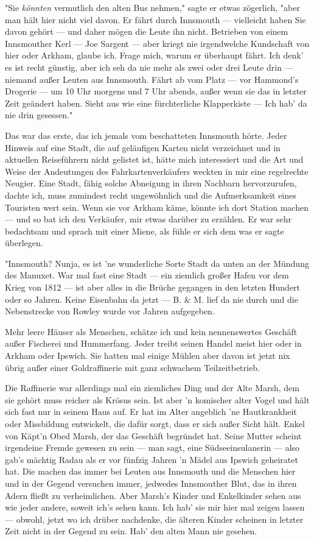 "Sie \textit{könnten} vermutlich den alten Bus nehmen," sagte er etwas zögerlich, "aber man hält hier nicht viel davon. Er fährt durch Innsmouth --- vielleicht haben Sie davon gehört --- und daher mögen die Leute ihn nicht. Betrieben von einem Innsmouther Kerl --- Joe Sargent --- aber kriegt nie irgendwelche Kundschaft von hier oder Arkham, glaube ich. Frage mich, warum er überhaupt fährt. Ich denk' es ist recht günstig, aber ich seh da nie mehr als zwei oder drei Leute drin --- niemand außer Leuten aus Innsmouth. Fährt ab vom Platz --- vor Hammond's Drogerie --- um 10 Uhr morgens und 7 Uhr abends, außer wenn sie das in letzter Zeit geändert haben. Sieht aus wie eine fürchterliche Klapperkiste --- Ich hab' da nie drin gesessen."

Das war das erste, das ich jemals vom beschatteten Innsmouth hörte. Jeder Hinweis auf eine Stadt, die auf geläufigen Karten nicht verzeichnet und in aktuellen Reiseführern nicht gelistet ist, hätte mich interessiert und die Art und Weise der Andeutungen des Fahrkartenverkäufers weckten in mir eine regelrechte Neugier. Eine Stadt, fähig solche Abneigung in ihren Nachbarn hervorzurufen, dachte ich, muss zumindest recht ungewöhnlich und die Aufmerksamkeit eines Touristen wert sein. Wenn sie vor Arkham käme, könnte ich dort Station machen --- und so bat ich den Verkäufer, mir etwas darüber zu erzählen. Er war sehr bedachtsam und sprach mit einer Miene, als fühle er sich dem was er sagte überlegen.

"Innsmouth? Nunja, es ist 'ne wunderliche Sorte Stadt da unten an der Mündung des Manuxet. War mal fast eine Stadt --- ein ziemlich großer Hafen vor dem Krieg von 1812 --- ist aber alles in die Brüche gegangen in den letzten Hundert oder so Jahren. Keine Eisenbahn da jetzt --- B. \& M. lief da nie durch und die Nebenstrecke von Rowley wurde vor Jahren aufgegeben.

Mehr leere Häuser als Menschen, schätze ich und kein nennenswertes Geschäft außer Fischerei und Hummerfang. Jeder treibt seinen Handel meist hier oder in Arkham oder Ipswich. Sie hatten mal einige Mühlen aber davon ist jetzt nix übrig außer einer Goldraffinerie mit ganz schwachem Teilzeitbetrieb.

Die Raffinerie war allerdings mal ein ziemliches Ding und der Alte Marsh, dem sie gehört muss reicher als Krösus sein. Ist aber 'n komischer alter Vogel und hält sich fast nur in seinem Haus auf. Er hat im Alter angeblich 'ne Hautkrankheit oder Missbildung entwickelt, die dafür sorgt, dass er sich außer Sicht hält. Enkel von Käpt'n Obed Marsh, der das Geschäft begründet hat. Seine Mutter scheint irgendeine Fremde gewesen  zu sein --- man sagt, eine Südseeinsulanerin --- also gab's mächtig Radau als er vor fünfzig Jahren 'n Mädel aus Ipswich geheiratet hat. Die machen das immer bei Leuten aus Innsmouth und die Menschen hier und in der Gegend versuchen immer, jedwedes Innsmouther Blut, das in ihren Adern fließt zu verheimlichen. Aber Marsh's Kinder und Enkelkinder sehen aus wie jeder andere, soweit ich's sehen kann. Ich hab' sie mir hier mal zeigen lassen --- obwohl, jetzt wo ich drüber nachdenke, die älteren Kinder scheinen in letzter Zeit nicht in der Gegend zu sein. Hab' den alten Mann nie gesehen.

